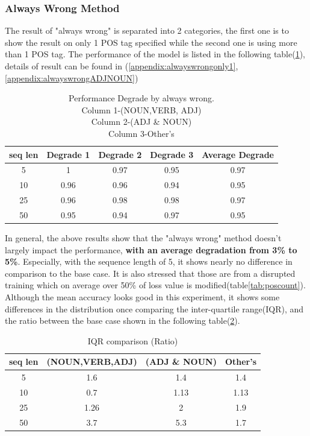 \documentclass[12pt]{article}
\begin{document}
\subsubsection{Always Wrong Method}
The result of "always wrong" is separated into 2 categories, the first one is to show the result on only 1 POS tag specified while the second one is using more than 1 POS tag. The performance of the model is listed in the following table(\ref{tab:alwayswrongDegrade}), details of result can be found in (\ref{appendix:alwayswrongonly1},\ref{appendix:alwayswrongADJNOUN})  

\begin{table}[!h]
\fontsize{10pt}{10pt}\selectfont
\begin{tabular}{|c|c|c|c|c|}
\hline
seq len & Degrade 1 & Degrade 2 & Degrade 3 & Average Degrade \\ \hline
5       & 1         & 0.97      & 0.95     & 0.97 \\ \hline
10      & 0.96      & 0.96      & 0.94     & 0.95 \\ \hline
25      & 0.96      & 0.98      & 0.98     & 0.97  \\ \hline
50      & 0.95      & 0.94      & 0.97     & 0.95 \\ \hline
\end{tabular}
\caption{Performance Degrade by always wrong. \\
Column 1-(NOUN,VERB, ADJ)\\ 
Column 2-(ADJ \& NOUN)\\
Column 3-Other's}
\label{tab:alwayswrongDegrade}
\end{table}

In general, the above results show that the "always wrong" method doesn't largely impact the performance, \textbf{with an average degradation from 3\% to 5\%}. Especially, with the sequence length of 5, it shows nearly no difference in comparison to the base case. It is also stressed that those are from a disrupted training which on average over 50\% of loss value is modified(table\ref{tab:poscount}). Although the mean accuracy looks good in this experiment, it shows some differences in the distribution once comparing the inter-quartile range(IQR), and the ratio between the base case shown in the following table(\ref{tab:alwayswrongIQR}).   
\begin{table}[!h]
\fontsize{10pt}{10pt}\selectfont
\begin{center}
\begin{tabular}{|c|c|c|c|}
\hline
seq len & (NOUN,VERB,ADJ) & (ADJ \& NOUN) & Other's \\ \hline
5       & 1.6             & 1.4         & 1.4    \\ \hline
10      & 0.7             & 1.13         & 1.13    \\ \hline
25      & 1.26            & 2            & 1.9     \\ \hline
50      & 3.7             & 5.3          & 1.7     \\ \hline
\end{tabular}
\caption{IQR comparison (Ratio) }
\label{tab:alwayswrongIQR}
\end{center}
\end{table}
\end{document}
